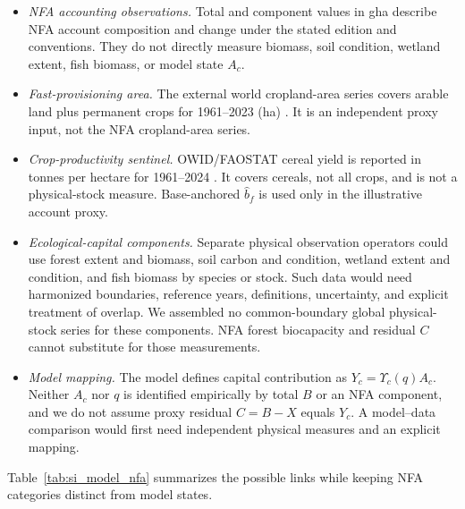\documentclass[11pt,a4paper]{article}
\newcommand{\Ups}{\Upsilon_c}
\begin{document}
\begin{itemize}[leftmargin=1.5em]
\item \emph{NFA accounting observations.} Total and component values in gha describe NFA account composition and change under the stated edition and conventions. They do not directly measure biomass, soil condition, wetland extent, fish biomass, or model state $A_c$.
\item \emph{Fast-provisioning area.} The external world cropland-area series covers arable land plus permanent crops for 1961--2023 (ha) \citep{OWIDCropland2026}. It is an independent proxy input, not the NFA cropland-area series.
\item \emph{Crop-productivity sentinel.} OWID/FAOSTAT cereal yield is reported in tonnes per hectare for 1961--2024 \citep{OWIDCereal2026}. It covers cereals, not all crops, and is not a physical-stock measure. Base-anchored $\hat b_f$ is used only in the illustrative account proxy.
\item \emph{Ecological-capital components.} Separate physical observation operators could use forest extent and biomass, soil carbon and condition, wetland extent and condition, and fish biomass by species or stock. Such data would need harmonized boundaries, reference years, definitions, uncertainty, and explicit treatment of overlap. We assembled no common-boundary global physical-stock series for these components. NFA forest biocapacity and residual $C$ cannot substitute for those measurements.
\item \emph{Model mapping.} The model defines capital contribution as $Y_c=\Ups(q)A_c$. Neither $A_c$ nor $q$ is identified empirically by total $B$ or an NFA component, and we do not assume proxy residual $C=B-X$ equals $Y_c$. A model--data comparison would first need independent physical measures and an explicit mapping.
\end{itemize}

Table~\ref{tab:si_model_nfa} summarizes the possible links while keeping NFA categories distinct from model states.
\end{document}
